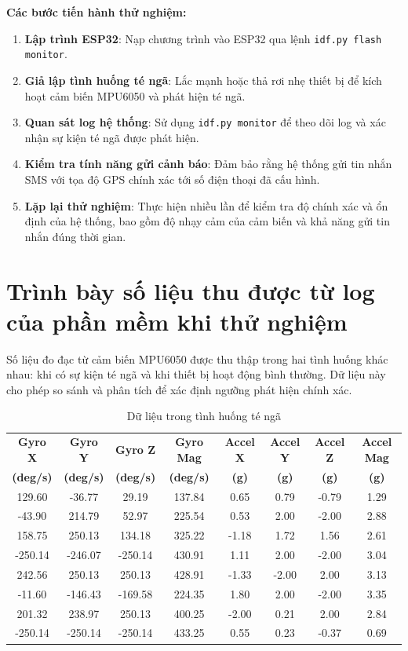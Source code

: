 \documentclass[a4paper,12pt]{report}
\begin{document}
	\textbf{Các bước tiến hành thử nghiệm:}
	\begin{enumerate}
		\item \textbf{Lập trình ESP32}: Nạp chương trình vào ESP32 qua lệnh \texttt{idf.py flash monitor}.
		\item \textbf{Giả lập tình huống té ngã}: Lắc mạnh hoặc thả rơi nhẹ thiết bị để kích hoạt cảm biến MPU6050 và phát hiện té ngã.
		\item \textbf{Quan sát log hệ thống}: Sử dụng \texttt{idf.py monitor} để theo dõi log và xác nhận sự kiện té ngã được phát hiện.
		\item \textbf{Kiểm tra tính năng gửi cảnh báo}: Đảm bảo rằng hệ thống gửi tin nhắn SMS với tọa độ GPS chính xác tới số điện thoại đã cấu hình.
		\item \textbf{Lặp lại thử nghiệm}: Thực hiện nhiều lần để kiểm tra độ chính xác và ổn định của hệ thống, bao gồm độ nhạy cảm của cảm biến và khả năng gửi tin nhắn đúng thời gian.
	\end{enumerate}
	
	\newpage
	
	\section{Trình bày số liệu thu được từ log của phần mềm khi thử nghiệm}
	
	Số liệu đo đạc từ cảm biến MPU6050 được thu thập trong hai tình huống khác nhau: khi có sự kiện té ngã và khi thiết bị hoạt động bình thường. Dữ liệu này cho phép so sánh và phân tích để xác định ngưỡng phát hiện chính xác.
	
	\begin{table}[h]
		\centering
		\caption{Dữ liệu trong tình huống té ngã}
		\label{tab:fall_data}
		\begin{tabular}{|c|c|c|c|c|c|c|c|}
			\hline
			\textbf{Gyro X} & \textbf{Gyro Y} & \textbf{Gyro Z} & \textbf{Gyro Mag} & \textbf{Accel X} & \textbf{Accel Y} & \textbf{Accel Z} & \textbf{Accel Mag} \\
			\textbf{(deg/s)} & \textbf{(deg/s)} & \textbf{(deg/s)} & \textbf{(deg/s)} & \textbf{(g)} & \textbf{(g)} & \textbf{(g)} & \textbf{(g)} \\
			\hline
			129.60 & -36.77 & 29.19 & 137.84 & 0.65 & 0.79 & -0.79 & 1.29 \\
			-43.90 & 214.79 & 52.97 & 225.54 & 0.53 & 2.00 & -2.00 & 2.88 \\
			158.75 & 250.13 & 134.18 & 325.22 & -1.18 & 1.72 & 1.56 & 2.61 \\
			-250.14 & -246.07 & -250.14 & 430.91 & 1.11 & 2.00 & -2.00 & 3.04 \\
			242.56 & 250.13 & 250.13 & 428.91 & -1.33 & -2.00 & 2.00 & 3.13 \\
			-11.60 & -146.43 & -169.58 & 224.35 & 1.80 & 2.00 & -2.00 & 3.35 \\
			201.32 & 238.97 & 250.13 & 400.25 & -2.00 & 0.21 & 2.00 & 2.84 \\
			-250.14 & -250.14 & -250.14 & 433.25 & 0.55 & 0.23 & -0.37 & 0.69 \\
			\hline
		\end{tabular}
	\end{table}
	
\end{document}
